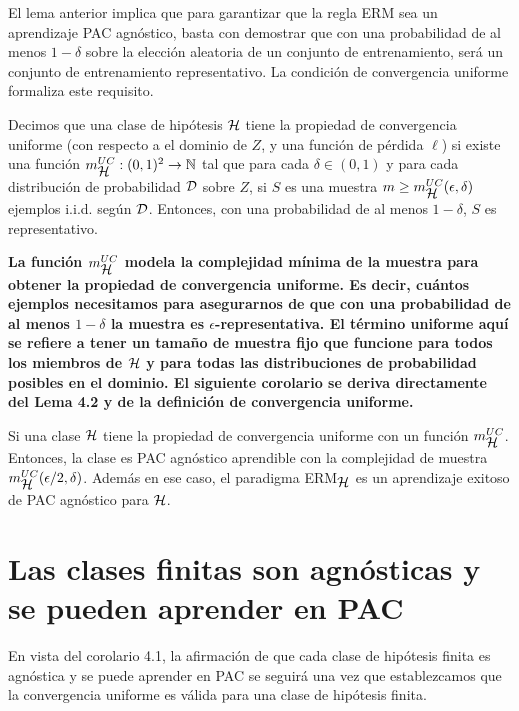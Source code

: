 El lema anterior implica que para garantizar que la regla ERM sea un aprendizaje PAC agnóstico, basta con demostrar que con una probabilidad de al menos $1 -\delta$ sobre la elección aleatoria de un conjunto de entrenamiento, será un conjunto de entrenamiento representativo. La condición de convergencia uniforme formaliza este requisito.

\begin{def.} Decimos que una clase de hipótesis $\mathop{\mbox{$\mathcal{H}$}}\nolimits$ tiene la propiedad de convergencia uniforme (con respecto a el dominio de $Z$, y una función de pérdida $\ell$) si existe una función $m_{\mathop{\mbox{$\mathcal{H}$}}\nolimits}^{UC}:(0,1)^2 \to\mathop{\mbox{$\mathbb{N}$}}\nolimits$ tal que para cada $\delta \in (0,1)$ y para cada distribución de probabilidad $\mathop{\mbox{$\mathcal{D}$}}\nolimits$ sobre $Z$, si $S$ es una muestra $m \geq m_{\mathop{\mbox{$\mathcal{H}$}}\nolimits}^{UC}(\epsilon,\delta)$ ejemplos i.i.d. según $\mathop{\mbox{$\mathcal{D}$}}\nolimits$. Entonces, con una probabilidad de al menos $1-\delta$, $S$ es representativo.
\end{def.}

\textbf{La función $m_{\mathop{\mbox{$\mathcal{H}$}}\nolimits}^{UC}$ modela la complejidad mínima de la muestra para obtener la propiedad de convergencia uniforme. Es decir, cuántos ejemplos necesitamos para asegurarnos de que con una probabilidad de al menos $1-\delta$ la muestra es $\epsilon$-representativa. El término uniforme aquí se refiere a tener un tamaño de muestra fijo que funcione para todos los miembros de $\mathop{\mbox{$\mathcal{H}$}}\nolimits$ y para todas las distribuciones de probabilidad posibles en el dominio. El siguiente corolario se deriva directamente del Lema 4.2 y de la definición de convergencia uniforme.}

\begin{cor}
    Si una clase $\mathop{\mbox{$\mathcal{H}$}}\nolimits$ tiene la propiedad de convergencia uniforme con un función $m_{\mathop{\mbox{$\mathcal{H}$}}\nolimits}^{UC}$. Entonces, la clase es PAC agnóstico aprendible con la complejidad de muestra $m_{\mathop{\mbox{$\mathcal{H}$}}\nolimits}^{UC}(\epsilon/2,\delta)$. Además en ese caso, el paradigma ERM$_{\mathop{\mbox{$\mathcal{H}$}}\nolimits}$ es un aprendizaje exitoso de PAC agnóstico para $\mathop{\mbox{$\mathcal{H}$}}\nolimits$.
\end{cor}

\section{Las clases finitas son agnósticas y se pueden aprender en PAC}
En vista del corolario 4.1, la afirmación de que cada clase de hipótesis finita es agnóstica y se puede aprender en PAC se seguirá una vez que establezcamos que la convergencia uniforme es válida para una clase de hipótesis finita. \\

